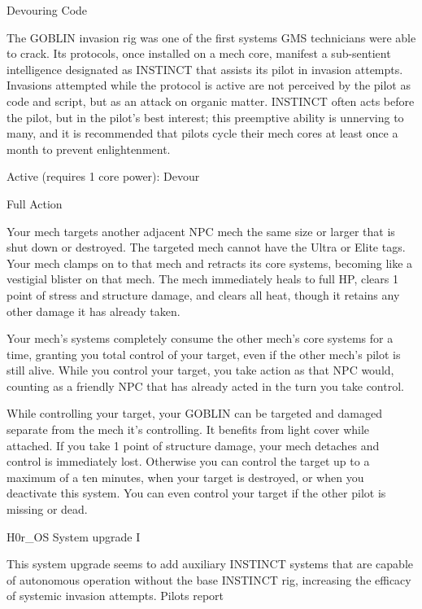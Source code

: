                                                   Devouring Code  

  The GOBLIN invasion rig was one of the first systems GMS technicians were able to crack. Its  
  protocols, once installed on a mech core, manifest a sub-sentient intelligence designated as INSTINCT  
  that assists its pilot in invasion attempts. Invasions attempted while the protocol is active are not  
  perceived by the pilot as code and script, but as an attack on organic matter. INSTINCT often acts  
  before the pilot, but in the pilot’s best interest; this preemptive ability is unnerving to many, and it is  
  recommended that pilots cycle their mech cores at least once a month to prevent enlightenment.     

  Active (requires 1 core power): Devour
 
  Full Action
 
  Your mech targets another adjacent NPC mech the same size or larger that is shut down or destroyed.  
  The targeted mech cannot have the Ultra or Elite tags. Your mech clamps on to that mech and retracts  
  its core systems, becoming like a vestigial blister on that mech. The mech immediately heals to full HP,  
  clears 1 point of stress and structure damage, and clears all heat, though it retains any other damage it  
  has already taken.
 

  Your mech’s systems completely consume the other mech’s core systems for a time, granting you total  
  control of your target, even if the other mech’s pilot is still alive. While you control your target, you take  
  action as that NPC would, counting as a friendly NPC that has already acted in the turn you take  
  control.
 

  While controlling your target, your GOBLIN can be targeted and damaged separate from the mech it’s  
  controlling. It benefits from light cover while attached. If you take 1 point of structure damage, your  
  mech detaches and control is immediately lost. Otherwise you can control the target up to a maximum  
  of a ten minutes, when your target is destroyed, or when you deactivate this system. You can even  
  control your target if the other pilot is missing or dead. 

H0r\_OS System upgrade I  

This system upgrade seems to add auxiliary INSTINCT systems that are capable of autonomous operation  
without the base INSTINCT rig, increasing the efficacy of systemic invasion attempts. Pilots report  

